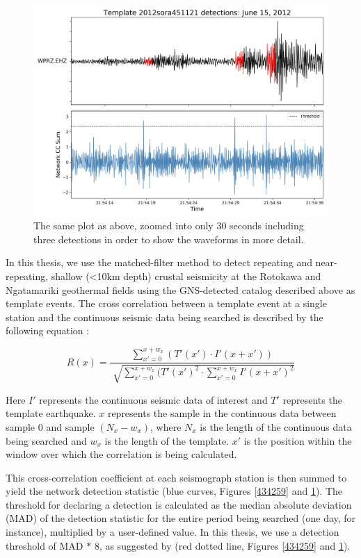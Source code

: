 \begin{figure}[h!]
\begin{center}
\includegraphics[width=0.70\columnwidth]{Chapter_2_Data/figures/2012sora451121_dets_cc_example_zoomed/2012sora451121_dets_cc_example_zoomed_original}
\caption{{The same plot as above, zoomed into only 30 seconds including three
detections in order to show the waveforms in more detail.
{\label{233225}}%
}}
\end{center}
\end{figure}


In this thesis, we use the matched-filter method to detect repeating and near-repeating, shallow (\textless10km depth) crustal seismicity at the Rotokawa and Ngatamariki geothermal fields using the GNS-detected catalog described above as template events. The cross correlation between a template event at a single station and the continuous seismic data being searched is described by the following equation \citep{Chamberlain_2017}:

\begin{equation}
R(x) = \frac{\sum_{x'=0}^{x+w_{x}}(T'(x') \cdot I'(x + x'))}{\sqrt[]{\sum_{x'=0}^{x+w_{x}}(T'(x')^2 \cdot \sum_{x'=0}^{x+w_{x}}I'(x+x')^2}}
\end{equation}

Here $I'$ represents the continuous seismic data of interest and $T'$ represents the template earthquake. $x$ represents the sample in the continuous data between sample $0$ and sample $(N_{x} - w_{x})$, where $N_{x}$ is the length of the continuous data being searched and $w_{x}$ is the length of the template. $x'$ is the position within the window over which the correlation is being calculated.

This cross-correlation coefficient at each seismograph station is then summed to yield the network detection statistic (blue curves, Figures \ref{434259} and \ref{233225}). The threshold for declaring a detection is calculated as the median absolute deviation (MAD) of the detection statistic for the entire period being searched (one day, for instance), multiplied by a user-defined value. In this thesis, we use a detection threshold of MAD $*$ 8, as suggested by \citep{Shelly_2007} (red dotted line, Figures \ref{434259} and \ref{233225}).

